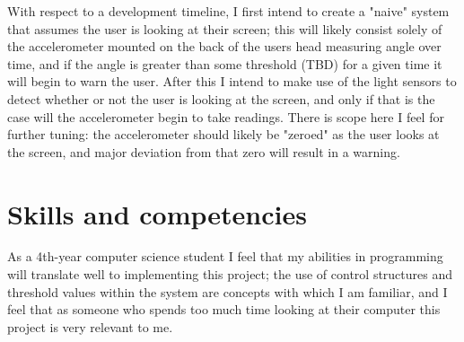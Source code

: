 \documentclass[12pt, a4paper]{article}
\begin{document}
\par

With respect to a development timeline, I first intend to create a "naive" system that assumes the user is looking at their screen; this will likely consist solely of the accelerometer mounted on the back of the users head measuring angle over time, and if the angle is greater than some threshold (TBD) for a given time it will begin to warn the user.
After this I intend to make use of the light sensors to detect whether or not the user is looking at the screen, and only if that is the case will the accelerometer begin to take readings.
There is scope here I feel for further tuning: the accelerometer should likely be "zeroed" as the user looks at the screen, and major deviation from that zero will result in a warning.

\section{Skills and competencies} %
As a 4th-year computer science student I feel that my abilities in programming will translate well to implementing this project; the use of control structures and threshold values within the system are concepts with which I am familiar, and I feel that as someone who spends too much time looking at their computer this project is very relevant to me.
\end{document}

